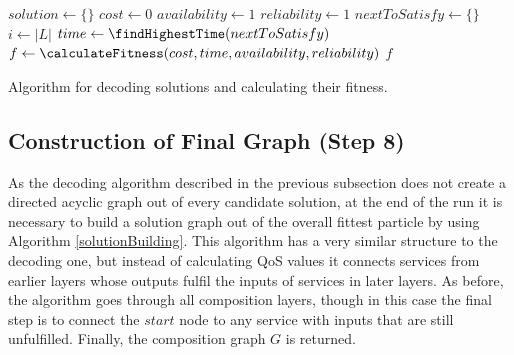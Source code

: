 \documentclass{llncs}
\begin{document}
\begin{algorithm}
\setlength{}
 \LinesNumbered
 \SetNlSty{}{}{:}
 $solution \leftarrow \{\}$\;
 $cost \leftarrow 0$\;
 $availability \leftarrow 1$\;
 $reliability \leftarrow 1$\;
 $nextToSatisfy \leftarrow \{\}$\;
 $i \leftarrow |L|$\;
 $time \leftarrow \findHighestTime(nextToSatisfy)$\;
 $f \leftarrow \calculateFitness(cost,time,availability,reliability)$\;
 \Return $f$\;
\caption{Algorithm for decoding solutions and calculating their fitness.}
\label{solutionDecoding}
\end{algorithm}

\subsection{Construction of Final Graph (Step 8)}

As the decoding algorithm described in the previous subsection does not create a directed acyclic graph out of every candidate solution, at the end of the run it is necessary to build a solution graph out of the overall fittest particle by using Algorithm \ref{solutionBuilding}. This algorithm has a very similar structure to the decoding one, but instead of calculating QoS values it connects services from earlier layers whose outputs fulfil the inputs of services in later layers. As before, the algorithm goes through all composition layers, though in this case the final step is to connect the $start$ node to any service with inputs that are still unfulfilled. Finally, the composition graph $G$ is returned.
\end{document}
